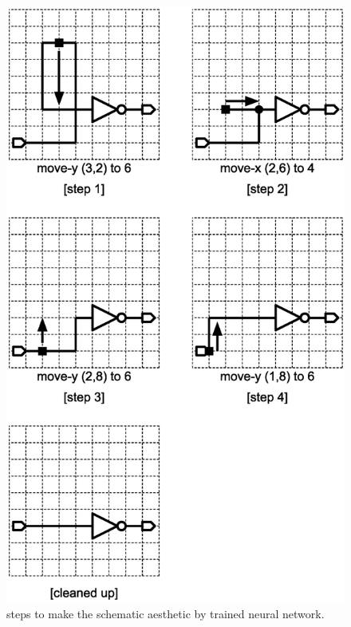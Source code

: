 \documentclass[twocolumn]{article}
\begin{document}
\begin{figure}[tb]
 \begin{center}
  \begin{minipage}{\hsize}
   \includegraphics[width=\hsize]{fig/edit_steps_02.eps}
   \caption{steps to make the schematic aesthetic by trained neural network.}
   \label{fig:edit_steps}
  \end{minipage}
 \end{center}
\end{figure}
\end{document}
